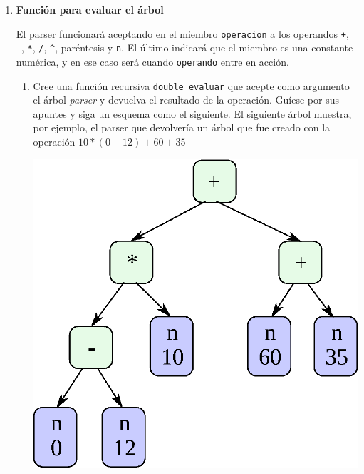 \documentclass[a4paper,10pt]{article}
\begin{document}
\begin{enumerate}
  \item \textbf{Función para evaluar el árbol}

  El parser funcionará aceptando en el miembro \texttt{operacion} a los operandos \texttt{+}, \texttt{-}, \texttt{*}, \texttt{/}, \texttt{\^}, paréntesis y
  \texttt{n}. El último indicará que el miembro es una constante numérica, y en ese caso será cuando \texttt{operando} entre en acción.

  \begin{enumerate}
      \item Cree una función recursiva \texttt{double evaluar} que acepte como argumento el árbol \textit{parser} y devuelva el resultado de la
	    operación. Guíese por sus apuntes y siga un esquema como el siguiente. El siguiente árbol muestra, por ejemplo, el parser que devolvería
	    un árbol que fue creado con la operación \texttt{$10 * (0 - 12) + 60 + 35$}
      
      \centering
      \includegraphics[scale=0.3]{esq_arbol.eps}

      
  \end{enumerate}


\end{enumerate}
\end{document}
